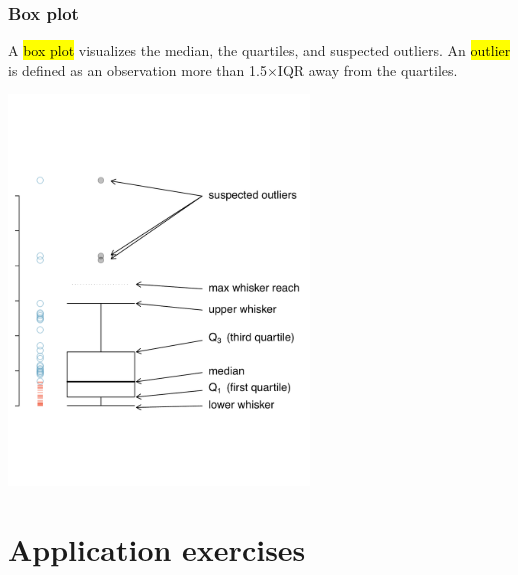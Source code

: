 \documentclass[11pt,containsverbatim,handout,xcolor=xelatex,dvipsnames,table]{beamer}
\begin{document}
\begin{frame}
\frametitle{Box plot}

A \hl{box plot} visualizes the median, the quartiles, and suspected outliers. An \hl{outlier} is defined as an observation more than 1.5$\times$IQR away from the quartiles.

\begin{center}
\includegraphics[width=0.6\textwidth]{figures/boxPlotLayoutNumVar}
\end{center}


\end{frame}


\section{Application exercises}

\end{document}
